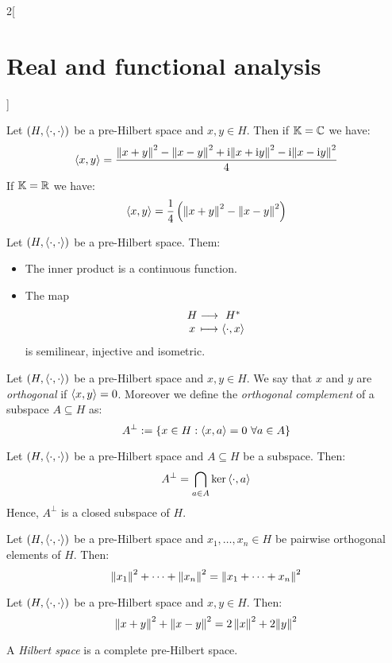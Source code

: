 \documentclass[../../../main_math.tex]{subfiles}
\begin{document}
\begin{multicols}{2}[\section{Real and functional analysis}]
\begin{proposition}
\begin{enumerate}
    \end{enumerate}
  \end{proposition}
  \begin{lemma}
    Let $(H,{\left\langle\cdot,\cdot\right\rangle})$ be a pre-Hilbert space and $x,y\in H$. Then if $\mathbb{K}=\mathbb{C}$ we have:
    $${\left\langle x,y\right\rangle}=\frac{{\left\|x+y\right\|}^2-{\left\|x-y\right\|}^2+\mathrm{i}{\left\|x+\mathrm{i} y\right\|}^2-\mathrm{i}{\left\|x-\mathrm{i} y\right\|}^2}{4}$$
    If $\mathbb{K}=\mathbb{R}$ we have:
    $${\left\langle x,y\right\rangle}=\frac{1}{4}\left({\left\|x+y\right\|}^2-{\left\|x-y\right\|}^2\right)$$
  \end{lemma}
  \begin{proposition}
    Let $(H,{\left\langle\cdot,\cdot\right\rangle})$ be a pre-Hilbert space. Them:
    \begin{itemize}
      \item The inner product is a continuous function.
      \item The map $$\function{}{H}{H^*}{x}{\dotp{\cdot}{x}}$$ is semilinear, injective and isometric.
    \end{itemize}
  \end{proposition}
  \begin{definition}
    Let $(H,{\left\langle\cdot,\cdot\right\rangle})$ be a pre-Hilbert space and $x,y\in H$. We say that $x$ and $y$ are \emph{orthogonal} if ${\left\langle x,y\right\rangle}=0$. Moreover we define the \emph{orthogonal complement} of a subspace $A\subseteq H$ as: $$A^\perp:=\{x\in H:\dotp{x}{a}=0\ \forall a\in A\}$$
  \end{definition}
  \begin{lemma}
    Let $(H,{\left\langle\cdot,\cdot\right\rangle})$ be a pre-Hilbert space and $A\subseteq H$ be a subspace. Then: $$A^\perp=\bigcap_{a\in A}\ker{\left\langle\cdot,a\right\rangle}$$
    Hence, $A^\perp$ is a closed subspace of $H$.
  \end{lemma}
  \begin{proposition}
    Let $(H,{\left\langle\cdot,\cdot\right\rangle})$ be a pre-Hilbert space and $x_1,\ldots, x_n\in H$ be pairwise orthogonal elements of $H$. Then: $${\left\|x_1\right\|}^2+\cdots + {\left\|x_n\right\|}^2={\left\|x_1+\cdots+x_n\right\|}^2$$
  \end{proposition}
  \begin{lemma}
    Let $(H,{\left\langle\cdot,\cdot\right\rangle})$ be a pre-Hilbert space and $x,y\in H$. Then: $$\left\|x+y\right\|^2+{\left\|x-y\right\|}^2=2\left\|x\right\|^2+2{\left\|y\right\|}^2$$
  \end{lemma}
  \begin{definition}
    A \emph{Hilbert space} is a complete pre-Hilbert space.
  \end{definition}

\end{multicols}
\end{document}
